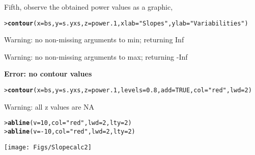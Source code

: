 \documentclass{article}\usepackage{graphicx, color}
\makeatletter
\newcommand{\hlfunctioncall}[1]{\textcolor[rgb]{0.501960784313725,0,0.329411764705882}{\textbf{#1}}}%
\newcommand{\hlstring}[1]{\textcolor[rgb]{0.6,0.6,1}{#1}}%
\newenvironment{kframe}{%
 \def\at@end@of@kframe{}%
 \ifinner\ifhmode%
  \def\at@end@of@kframe{\end{minipage}}%
  \begin{minipage}{\columnwidth}%
 \fi\fi%
 \def\FrameCommand##1{\hskip\@totalleftmargin \hskip-\fboxsep
 \colorbox{shadecolor}{##1}\hskip-\fboxsep
     \hskip-\linewidth \hskip-\@totalleftmargin \hskip\columnwidth}%
 \MakeFramed {\advance\hsize-\width
   \@totalleftmargin\z@ \linewidth\hsize
   \@setminipage}}%
 {\par\unskip\endMakeFramed%
 \at@end@of@kframe}
\newenvironment{knitrout}{}{} %
\makeatother
\begin{document}
Fifth, observe the obtained power values as a graphic,
\begin{knitrout}
\color{fgcolor}\begin{kframe}
\begin{alltt}
> \hlfunctioncall{contour}(x=bs,y=s.yxs,z=power.1,xlab=\hlstring{"Slopes"},ylab=\hlstring{"Variabilities"})
\end{alltt}


{\ttfamily\noindent\textcolor{warningcolor}{Warning: no non-missing arguments to min; returning Inf}}

{\ttfamily\noindent\textcolor{warningcolor}{Warning: no non-missing arguments to max; returning -Inf}}

{\ttfamily\noindent\bfseries\textcolor{errorcolor}{Error: no contour values}}\begin{alltt}
> \hlfunctioncall{contour}(x=bs,y=s.yxs,z=power.1,levels=0.8,add=TRUE,col=\hlstring{"red"},lwd=2)
\end{alltt}


{\ttfamily\noindent\textcolor{warningcolor}{Warning: all z values are NA}}\begin{alltt}
> \hlfunctioncall{abline}(v=10,col=\hlstring{"red"},lwd=2,lty=2)
> \hlfunctioncall{abline}(v=-10,col=\hlstring{"red"},lwd=2,lty=2)
\end{alltt}
\end{kframe}

{\centering \texttt{[image: Figs/Slopecalc2]} 

}



\end{knitrout}
\end{document}
